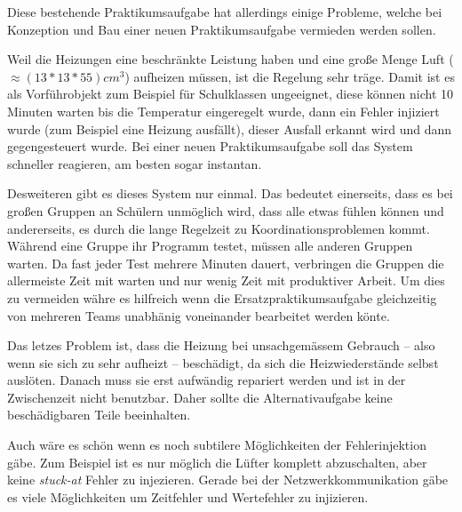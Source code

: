 Diese bestehende Praktikumsaufgabe hat allerdings einige Probleme, welche bei Konzeption und Bau einer neuen
Praktikumsaufgabe vermieden werden sollen.

Weil die Heizungen eine beschr{\"{a}}nkte Leistung haben und eine gro{\ss}e Menge Luft 
($ \approx (13*13*55)cm^3$) aufheizen m{\"{u}}ssen, ist die Regelung sehr tr{\"{a}}ge. Damit ist es als
Vorf{\"{u}}hrobjekt zum Beispiel f{\"{u}}r Schulklassen ungeeignet, diese k{\"{o}}nnen nicht 10 Minuten warten
bis die Temperatur eingeregelt wurde, dann ein Fehler injiziert wurde (zum Beispiel eine Heizung
ausf{\"{a}}llt), dieser Ausfall erkannt wird und dann gegengesteuert wurde. Bei einer neuen Praktikumsaufgabe
soll das System schneller reagieren, am besten sogar instantan.

Desweiteren gibt es dieses System nur einmal. Das bedeutet einerseits, dass es bei gro{\ss}en Gruppen
an Sch{\"{u}}lern unm{\"{o}}glich wird, dass alle etwas f{\"{u}}hlen k{\"{o}}nnen und andererseits, es durch
die lange Regelzeit zu Koordinationsproblemen kommt. W{\"{a}}hrend eine Gruppe ihr Programm testet, m{\"{u}}ssen
alle anderen Gruppen warten. Da fast jeder Test mehrere Minuten dauert, verbringen die Gruppen die
allermeiste Zeit mit warten und nur wenig Zeit mit produktiver Arbeit. Um dies zu vermeiden w{\"{a}}hre es
hilfreich wenn die Ersatzpraktikumsaufgabe gleichzeitig von mehreren Teams unabh{\"{a}}nig voneinander bearbeitet
werden k{\"{o}}nte.

Das letzes Problem ist, dass die Heizung bei unsachgem{\"{a}}ssem Gebrauch -- also wenn sie sich zu sehr aufheizt --
besch{\"{a}}digt, da sich die Heizwiederst{\"{a}}nde selbst ausl{\"{o}}ten. Danach muss sie erst aufw{\"{a}}ndig
repariert werden und ist in der Zwischenzeit nicht benutzbar. Daher sollte die Alternativaufgabe keine besch{\"{a}}digbaren
Teile beeinhalten.

Auch w{\"{a}}re es sch{\"{o}}n wenn es noch subtilere M{\"{o}}glichkeiten der Fehlerinjektion g{\"{a}}be. Zum Beispiel ist
es nur m{\"{o}}glich die L{\"{u}}fter komplett abzuschalten, aber keine \textit{stuck-at} Fehler zu injezieren.
Gerade bei der Netzwerkkommunikation g{\"{a}}be es viele M{\"{o}}glichkeiten um Zeitfehler und Wertefehler zu injizieren.

\clearpage
